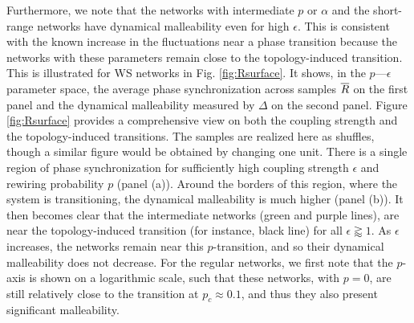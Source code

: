Furthermore, we note that the networks with intermediate $p$ or $\alpha$ and the short-range networks have dynamical malleability even for high $\epsilon$. This is consistent with the known increase in the fluctuations near a phase transition \cite{ hong2007entrainment, brankov2000theory, hildebrand2007kinetic} because the networks with these parameters remain close to the topology-induced transition.
This is illustrated for WS networks in Fig. \ref{fig:Rsurface}. It shows, in the $p \text{---} \epsilon$ parameter space, the average phase synchronization across samples $\overline{R}$ on the first panel and the dynamical malleability measured by $\Delta$ on the second panel. Figure \ref{fig:Rsurface} provides a comprehensive view on both the coupling strength and the topology-induced transitions. The samples are realized here as shuffles, though a similar figure would be obtained by changing one unit. There is a single region of phase synchronization for sufficiently high coupling strength $\epsilon$ and rewiring probability $p$ (panel (a)). Around the borders of this region, where the system is transitioning, the dynamical malleability is much higher (panel (b)). It then becomes clear that the intermediate networks (green and purple lines), are near the topology-induced transition (for instance, black line) for all $\epsilon \gtrapprox 1$. As $\epsilon$ increases, the networks remain near this $p$-transition, and so their dynamical malleability does not decrease. 
For the regular networks, we first note that the $p$-axis is shown on a logarithmic scale, such that these networks, with $p = 0$, are still relatively close to the transition at $p_c \approx 0.1$, and thus they also present significant malleability.

